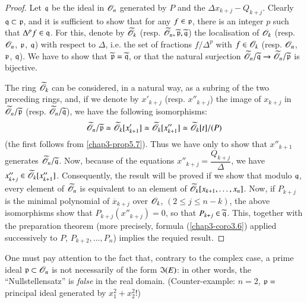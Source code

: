 \begin{proof}
Let $\mathfrak{q}$ be the ideal in $\mathscr{O}_{n}$ generated by $P$ and the $\Delta x_{k+j}-Q_{k+j}$. Clearly $\mathfrak{q}\subset \mathfrak{p}$, and it is sufficient to show that for any $f\in \mathfrak{p}$, there is an integer $p$ such that $\Delta^{p}f\in \mathfrak{q}$. For this, denote by $\widetilde{\mathscr{O}}_{k}$ (resp. $\widetilde{\mathscr{O}}_{n},\widetilde{\mathfrak{p}},\widetilde{\mathfrak{q}}$) the localisation of $\mathscr{O}_{k}$ (resp. $\mathscr{O}_{n}$, $\mathfrak{p}$, $\mathfrak{q}$) with respect to $\Delta$, i.e. the set of fractions $f/\Delta^{p}$ with $f\in \mathscr{O}_{k}$ (resp. $\mathscr{O}_{n}$, $\mathfrak{p}$, $\mathfrak{q}$). We have to show that $\widetilde{\mathfrak{p}}=\widetilde{\mathfrak{q}}$, or that the natural surjection $\widetilde{\mathscr{O}}_{n}/\widetilde{\mathfrak{q}}\to \widetilde{\mathscr{O}}_{n}/\widetilde{\mathfrak{p}}$ is bijective.

The ring $\widetilde{\mathscr{O}}_{k}$ can be considered, in a natural way, as a subring of the two preceding rings, and, if we denote by $x'_{k+j}$ (resp. $x''_{k+j}$) the image of $x_{k+j}$ in $\widetilde{\mathscr{O}}_{n}/\widetilde{\mathfrak{p}}$ (resp. $\widetilde{\mathscr{O}}_{n}/\widetilde{\mathfrak{q}}$), we have the following isomorphisms:
$$
\widetilde{\mathscr{O}}_{n}/\widetilde{\mathfrak{p}}\simeq \widetilde{\mathscr{O}}_{k}[x'_{k+1}]\simeq \widetilde{\mathscr{O}}_{k}[x''_{k+1}]\simeq \widetilde{\mathscr{O}}_{k}[t]/(P)
$$
(the first follows from \ref{chap3-prop5.7}). Thus we have only to show that $x''_{k+1}$ generates $\widetilde{\mathscr{O}}_{n}/\widetilde{\mathfrak{q}}$. Now, because of the equations $x''_{k+j}=\dfrac{Q_{k+j}}{\Delta}$, we have $x''_{k+j}\in \widetilde{\mathscr{O}}_{k}[x''_{k+1}]$. Consequently, the result will be proved if we show that modulo $\mathfrak{q}$, every element of $\widetilde{\mathscr{O}}_{n}$ is equivalent to an element of $\widetilde{\mathscr{O}}_{k}[x_{k+1},\ldots,x_{n}]$. Now, if $P_{k+j}$ is the minimal polynomial of $\overline{x}_{k+j}$ over $\mathscr{O}_{k}$, $(2\leq j\leq n-k)$, the above isomorphisms show that $P_{k+j}(x''_{k+j})=0$, so that $P_{k+j}\in \widetilde{\mathfrak{q}}$. This, together with the preparation theorem (more precisely, formula (\ref{chap3-coro3.6}) applied successively to $P$, $P_{k+2},\ldots,P_{n}$) implies the requied result.
\end{proof}

\begin{remark}\label{chap3-rem5.9}
One must pay attention to the fact that, contrary to the complex case, a prime ideal $\mathfrak{p}\subset \mathscr{O}_{n}$ is not necessarily of the form $\mathfrak{I}(E)$: in other words, the ``Nullstellensatz'' is {\em false} in the real domain. (Counter-example: $n=2$, $\mathfrak{p}=$ principal ideal generated by $x^{2}_{1}+x^{2}_{2}$!)
\end{remark}
